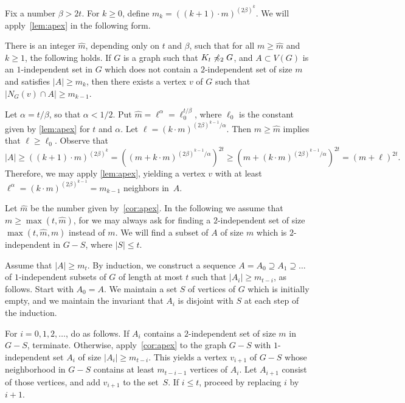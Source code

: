 \newcommand{\mbull}{\widehat{m}}

Fix a number $\beta>2t$. For $k\ge 0$,
define $m_k=((k+1)\cdot m)^{(2\beta)^k}$.
We will apply~\cref{lem:apex} in the following form.
\begin{claim}\label{cor:apex}
	There is an integer $\mbull$, depending only on $t$ and $\beta$, such that for all $m\ge \mbull$ and $k\ge 1$, the following holds.
	If $G$ is a graph such that $K_t\not\preccurlyeq_2 G$, and
	$A\subset V(G)$ is an $1$-independent set in $G$ which does not contain a $2$-independent set of size $m$ and satisfies $|A|\ge m_k$, %
	then there exists a vertex $v$ of $G$ such that $|N_G(v)\cap A| \ge m_{k-1}$.%
\end{claim}
\begin{clproof}
Let $\alpha=t/\beta$, so that $\alpha<1/2$.
Put $\mbull= \ell^{\alpha}=\ell_0^{t/\beta}$, where $\ell_0$ is the constant given by \cref{lem:apex} for $t$ and $\alpha$.
Let $\ell=(k\cdot m)^{(2\beta)^{k-1}/\alpha}$.
Then $m\ge \mbull$ implies that $\ell\ge\ell_0$.
Observe that
$$|A|\ge \left((k+1)\cdot m\right)^{(2\beta)^k}=\left ((m+ k\cdot m)^{(2\beta)^{k-1}/\alpha} \right)^{2t}
\ge (m+(k\cdot m)^{(2\beta)^{k-1}/\alpha})^{2t}=(m+\ell)^{2t}.$$
Therefore, we may  apply \cref{lem:apex}, yielding a vertex $v$ with at least $\ell^\alpha=(k\cdot m)^{(2\beta)^{k-1}}=m_{k-1}$ neighbors in~$A$.
\end{clproof}


Let $\mbull$ be the number given by~\cref{cor:apex}. 
In the following we assume that $m\geq \max(t,\mbull)$, for we may always ask for finding a $2$-independent set of size $\max(t,\mbull,m)$ instead of $m$.
We will find 
a subset of $A$ of size $m$ which is $2$-independent in $G-S$, where $|S|\le t$.


Assume that $|A|\ge m_t$. By induction, we
 construct a sequence  $A=A_0\supseteq A_1\supseteq\ldots$ 
of $1$-independent subsets of $G$
of length at most $t$
such that $|A_i|\ge m_{t-i}$,
 as follows. Start with $A_0=A$. We maintain a set $S$ of vertices of $G$ which is initially empty, and we maintain the invariant that $A_i$ is disjoint with $S$ at each step of the induction.

For $i=0,1,2,\ldots$, do as follows.
If $A_{i}$ contains a $2$-independent set of size $m$ in $G-S$, terminate.
 Otherwise, 
 apply~\cref{cor:apex} to the graph $G-S$ with $1$-independent set
 $A_{i}$ of size $|A_i|\ge m_{t-i}$. This yields a vertex $v_{i+1}$ of $G-S$
 whose neighborhood in $G-S$ contains at least
 $m_{t-i-1}$ vertices of $A_{i}$.
 Let $A_{i+1}$ consist of those vertices, and add $v_{i+1}$
 to the set~$S$.  
  If $i\le t$, proceed by replacing $i$ by $i+1$.

